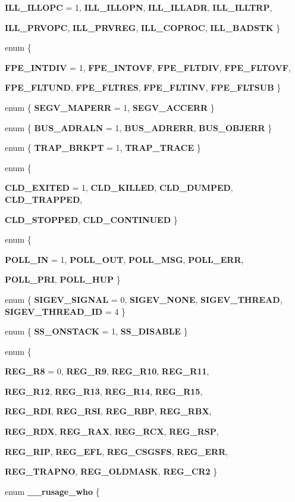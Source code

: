 \begin{DoxyCompactItemize}
{\bf ILL\_\-ILLOPC} =  1, 
{\bf ILL\_\-ILLOPN}, 
{\bf ILL\_\-ILLADR}, 
{\bf ILL\_\-ILLTRP}, 
\par
{\bf ILL\_\-PRVOPC}, 
{\bf ILL\_\-PRVREG}, 
{\bf ILL\_\-COPROC}, 
{\bf ILL\_\-BADSTK}
 \}
\item 
enum \{ \par
{\bf FPE\_\-INTDIV} =  1, 
{\bf FPE\_\-INTOVF}, 
{\bf FPE\_\-FLTDIV}, 
{\bf FPE\_\-FLTOVF}, 
\par
{\bf FPE\_\-FLTUND}, 
{\bf FPE\_\-FLTRES}, 
{\bf FPE\_\-FLTINV}, 
{\bf FPE\_\-FLTSUB}
 \}
\item 
enum \{ {\bf SEGV\_\-MAPERR} =  1, 
{\bf SEGV\_\-ACCERR}
 \}
\item 
enum \{ {\bf BUS\_\-ADRALN} =  1, 
{\bf BUS\_\-ADRERR}, 
{\bf BUS\_\-OBJERR}
 \}
\item 
enum \{ {\bf TRAP\_\-BRKPT} =  1, 
{\bf TRAP\_\-TRACE}
 \}
\item 
enum \{ \par
{\bf CLD\_\-EXITED} =  1, 
{\bf CLD\_\-KILLED}, 
{\bf CLD\_\-DUMPED}, 
{\bf CLD\_\-TRAPPED}, 
\par
{\bf CLD\_\-STOPPED}, 
{\bf CLD\_\-CONTINUED}
 \}
\item 
enum \{ \par
{\bf POLL\_\-IN} =  1, 
{\bf POLL\_\-OUT}, 
{\bf POLL\_\-MSG}, 
{\bf POLL\_\-ERR}, 
\par
{\bf POLL\_\-PRI}, 
{\bf POLL\_\-HUP}
 \}
\item 
enum \{ {\bf SIGEV\_\-SIGNAL} =  0, 
{\bf SIGEV\_\-NONE}, 
{\bf SIGEV\_\-THREAD}, 
{\bf SIGEV\_\-THREAD\_\-ID} =  4
 \}
\item 
enum \{ {\bf SS\_\-ONSTACK} =  1, 
{\bf SS\_\-DISABLE}
 \}
\item 
enum \{ \par
{\bf REG\_\-R8} =  0, 
{\bf REG\_\-R9}, 
{\bf REG\_\-R10}, 
{\bf REG\_\-R11}, 
\par
{\bf REG\_\-R12}, 
{\bf REG\_\-R13}, 
{\bf REG\_\-R14}, 
{\bf REG\_\-R15}, 
\par
{\bf REG\_\-RDI}, 
{\bf REG\_\-RSI}, 
{\bf REG\_\-RBP}, 
{\bf REG\_\-RBX}, 
\par
{\bf REG\_\-RDX}, 
{\bf REG\_\-RAX}, 
{\bf REG\_\-RCX}, 
{\bf REG\_\-RSP}, 
\par
{\bf REG\_\-RIP}, 
{\bf REG\_\-EFL}, 
{\bf REG\_\-CSGSFS}, 
{\bf REG\_\-ERR}, 
\par
{\bf REG\_\-TRAPNO}, 
{\bf REG\_\-OLDMASK}, 
{\bf REG\_\-CR2}
 \}
\item 
enum {\bf \_\-\_\-rusage\_\-who} \{ \par

\end{DoxyCompactItemize}
